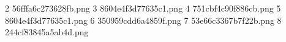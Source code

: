 2 56fffa6c273628fb.png
3 8604e4f3d77635c1.png
4 751cbf4c90f886cb.png
5 8604e4f3d77635c1.png
6 350959cdd6a4859f.png
7 53e66c3367b7f22b.png
8 244cf83845a5ab4d.png
